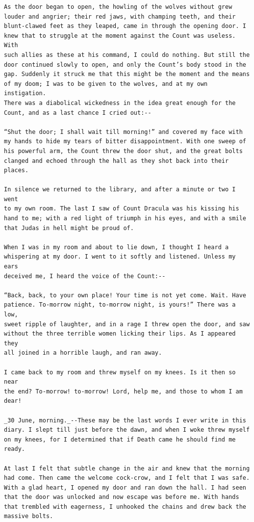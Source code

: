 \documentclass{article}
\begin{document}
\begin{verbatim}
As the door began to open, the howling of the wolves without grew
louder and angrier; their red jaws, with champing teeth, and their
blunt-clawed feet as they leaped, came in through the opening door. I
knew that to struggle at the moment against the Count was useless. With
such allies as these at his command, I could do nothing. But still the
door continued slowly to open, and only the Count’s body stood in the
gap. Suddenly it struck me that this might be the moment and the means
of my doom; I was to be given to the wolves, and at my own instigation.
There was a diabolical wickedness in the idea great enough for the
Count, and as a last chance I cried out:--

“Shut the door; I shall wait till morning!” and covered my face with
my hands to hide my tears of bitter disappointment. With one sweep of
his powerful arm, the Count threw the door shut, and the great bolts
clanged and echoed through the hall as they shot back into their
places.

In silence we returned to the library, and after a minute or two I went
to my own room. The last I saw of Count Dracula was his kissing his
hand to me; with a red light of triumph in his eyes, and with a smile
that Judas in hell might be proud of.

When I was in my room and about to lie down, I thought I heard a
whispering at my door. I went to it softly and listened. Unless my ears
deceived me, I heard the voice of the Count:--

“Back, back, to your own place! Your time is not yet come. Wait. Have
patience. To-morrow night, to-morrow night, is yours!” There was a low,
sweet ripple of laughter, and in a rage I threw open the door, and saw
without the three terrible women licking their lips. As I appeared they
all joined in a horrible laugh, and ran away.

I came back to my room and threw myself on my knees. Is it then so near
the end? To-morrow! to-morrow! Lord, help me, and those to whom I am
dear!

_30 June, morning._--These may be the last words I ever write in this
diary. I slept till just before the dawn, and when I woke threw myself
on my knees, for I determined that if Death came he should find me
ready.

At last I felt that subtle change in the air and knew that the morning
had come. Then came the welcome cock-crow, and I felt that I was safe.
With a glad heart, I opened my door and ran down the hall. I had seen
that the door was unlocked and now escape was before me. With hands
that trembled with eagerness, I unhooked the chains and drew back the
massive bolts.


\end{verbatim}
\end{document}
